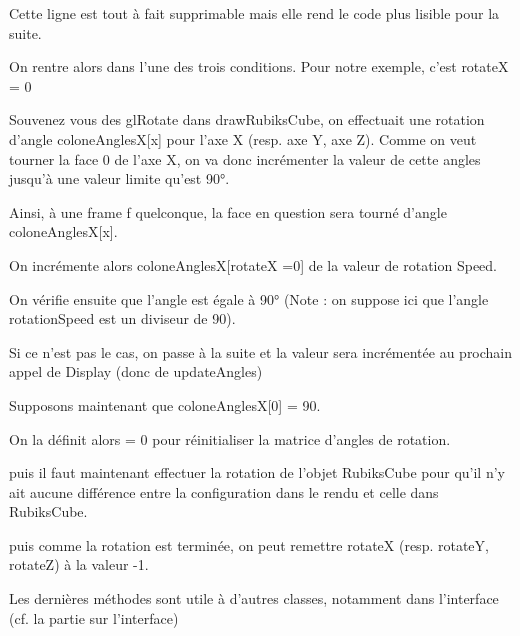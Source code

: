 Cette ligne est tout à fait supprimable mais elle rend le code plus lisible pour la suite.

On rentre alors dans l’une des trois conditions. Pour notre exemple, c’est rotateX = 0

Souvenez vous des glRotate dans drawRubiksCube, on effectuait une rotation d’angle coloneAnglesX[x] pour l’axe X (resp. axe Y, axe Z). Comme on veut tourner la face 0 de l’axe X, on va donc incrémenter la valeur de cette angles jusqu’à une valeur limite qu’est 90°.

Ainsi, à une frame f quelconque, la face en question sera tourné d’angle coloneAnglesX[x].

On incrémente alors coloneAnglesX[rotateX =0] de la valeur de rotation Speed.

On vérifie ensuite que l’angle est égale à 90° (Note : on suppose ici que l’angle rotationSpeed est un diviseur de 90).

Si ce n’est pas le cas, on passe à la suite et la valeur sera incrémentée au prochain appel de Display (donc de updateAngles)

Supposons maintenant que coloneAnglesX[0] = 90.

On la définit alors = 0 pour réinitialiser la matrice d’angles de rotation.

puis il faut maintenant effectuer la rotation de l’objet RubiksCube pour qu’il n’y ait aucune différence entre la configuration dans le rendu et celle dans RubiksCube.

puis comme la rotation est terminée, on peut remettre rotateX (resp. rotateY, rotateZ)  à la valeur -1.

Les dernières méthodes sont utile à d’autres classes, notamment dans l’interface (cf. la partie sur l'interface)

